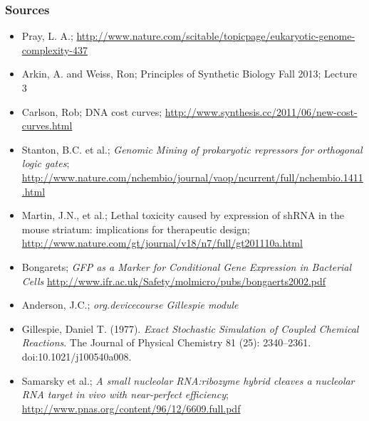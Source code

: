 \documentclass{beamer}
\begin{document}
\begin{frame}
\frametitle{Sources}

\begin{itemize}
\item Pray, L. A.; \url{http://www.nature.com/scitable/topicpage/eukaryotic-genome-complexity-437}
\item Arkin, A. and Weiss, Ron; Principles of Synthetic Biology Fall 2013; Lecture 3
\item Carlson, Rob; DNA cost curves; \url{http://www.synthesis.cc/2011/06/new-cost-curves.html}
\item Stanton, B.C. et al.; \emph{Genomic Mining of prokaryotic repressors for orthogonal logic gates};
  \url{http://www.nature.com/nchembio/journal/vaop/ncurrent/full/nchembio.1411.html}
\item Martin, J.N., et al.; Lethal toxicity caused by expression of shRNA in the mouse striatum: implications for therapeutic design;
  \url{http://www.nature.com/gt/journal/v18/n7/full/gt201110a.html}
\item Bongarets; \emph{GFP as a Marker for Conditional Gene Expression in Bacterial Cells}
  \url{http://www.ifr.ac.uk/Safety/molmicro/pubs/bongaerts2002.pdf}
\item Anderson, J.C.; \emph{org.devicecourse Gillespie module}
\item Gillespie, Daniel T. (1977). \emph{Exact Stochastic Simulation of Coupled Chemical Reactions}. The Journal of Physical Chemistry 81 (25): 2340–2361. doi:10.1021/j100540a008.
\item Samarsky et al.; \emph{A small nucleolar RNA:ribozyme hybrid cleaves a nucleolar RNA
target in vivo with near-perfect efficiency}; \url{http://www.pnas.org/content/96/12/6609.full.pdf}
\end{itemize}

\end{frame}

\end{document}
